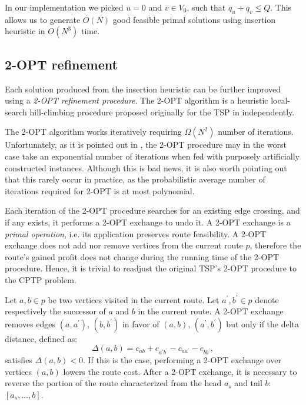 In our implementation we picked $u = 0$ and $v \in V_0$, such that $q_u + q_v \le Q$.
This allows us to generate $O(N)$ good feasible primal solutions using insertion heuristic in $O(N^3)$ time.

\subsection{2-OPT refinement}
\label{sec:impl-2opt-refinement}

Each solution produced from the insertion heuristic
can be further improved using a \textit{2-OPT refinement procedure}.
The 2-OPT algorithm is a heuristic local-search hill-climbing procedure
proposed originally for the TSP in \textcite{flood1956, croes1958} independently.

The 2-OPT algorithm works iteratively requiring $\Omega(N^2)$ number of iterations.
Unfortunately,
as it is pointed out in \textcite{chandra1999},
the 2-OPT procedure may in the worst case take an exponential number of iterations
when fed with purposely artificially constructed instances.
Although this is bad news,
it is also worth pointing out that this rarely occur in practice,
as the probabilistic average number of iterations required for 2-OPT is at most polynomial.

Each iteration of the 2-OPT procedure searches for an existing edge crossing,
and if any exists,
it performs a 2-OPT exchange to undo it.
A 2-OPT exchange is a \textit{primal operation},
i.e. its application preserves route feasibility.
A 2-OPT exchange does not add nor remove vertices from the current route $p$,
therefore the route's gained profit does not change during
the running time of the 2-OPT procedure.
Hence, it is trivial to readjust the original TSP's 2-OPT procedure to the CPTP problem.

Let $a, b \in p$ be two vertices visited in the current route.
Let $a^\prime, b^\prime \in p$ denote respectively the successor of $a$ and $b$ in the current route.
A 2-OPT exchange removes edges $(a, a^\prime)$, $(b, b^\prime)$
in favor of $(a, b)$, $(a^\prime, b^\prime)$
but only if the delta distance, defined as:
\begin{equation}
	\Delta(a, b) = c_{a b} + c_{a^\prime b^\prime} - c_{a a^\prime} - c_{b b^\prime},
\end{equation}
satisfies $\Delta(a, b) < 0$.
If this is the case, performing a 2-OPT exchange over vertices $(a, b)$ lowers the route cost.
After a 2-OPT exchange,
it is necessary to reverse the portion of the route
characterized from the head $a_s$ and tail $b$: $[a_s, \dots, b]$.

